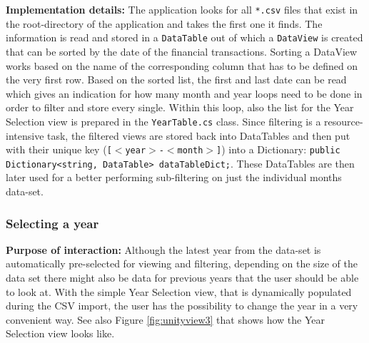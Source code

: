 \textbf{Implementation details:} The application looks for all \texttt{*.csv} files that exist in the root-directory of the application and takes the first one it finds. The information is read and stored in a \texttt{DataTable} out of which a \texttt{DataView} is created that can be sorted by the date of the financial transactions. Sorting a DataView works based on the name of the corresponding column that has to be defined on the very first row. Based on the sorted list, the first and last date can be read which gives an indication for how many month and year loops need to be done in order to filter and store every single. Within this loop, also the list for the Year Selection view is prepared in the \texttt{YearTable.cs} class. Since filtering is a resource-intensive task, the filtered views are stored back into DataTables and then put with their unique key (\texttt{[$<$year$>$-$<$month$>$]}) into a Dictionary: \texttt{public Dictionary<string, DataTable> dataTableDict;}. These DataTables are then later used for a better performing sub-filtering on just the individual months data-set.

\subsubsection{Selecting a year}

\textbf{Purpose of interaction:} Although the latest year from the data-set is automatically pre-selected for viewing and filtering, depending on the size of the data set there might also be data for previous years that the user should be able to look at. With the simple Year Selection view, that is dynamically populated during the CSV import, the user has the possibility to change the year in a very convenient way. See also Figure \ref{fig:unityview3} that shows how the Year Selection view looks like.

